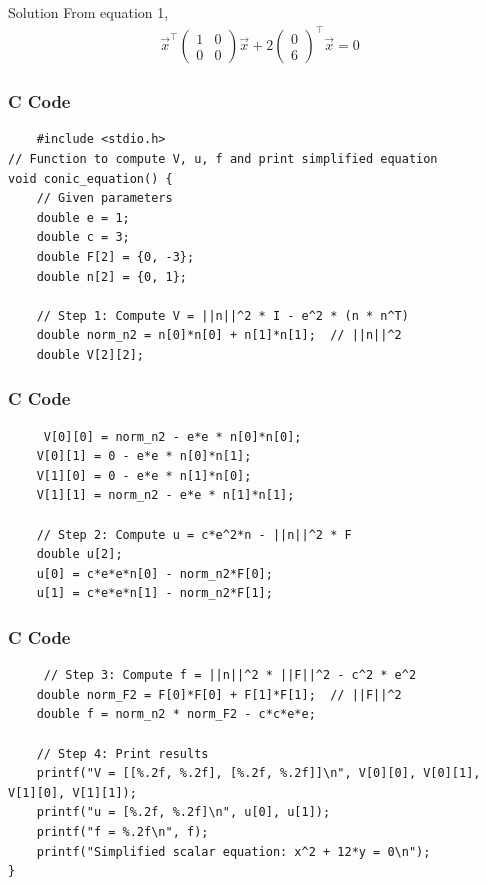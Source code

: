 \documentclass{beamer}
\begin{document}
\begin{frame}{Solution}
    From equation 1,
\begin{align}
    \Vec{x}^\top \begin{pmatrix}
        1 & 0 \\ 0 & 0
    \end{pmatrix} \Vec{x} + 2 \begin{pmatrix}
        0 \\ 6
    \end{pmatrix} ^ \top \Vec{x} =0 
\end{align}
\end{frame}
\begin{frame}[fragile]
\frametitle{C Code}
\begin{lstlisting}
    #include <stdio.h>
// Function to compute V, u, f and print simplified equation
void conic_equation() {
    // Given parameters
    double e = 1;
    double c = 3;
    double F[2] = {0, -3};
    double n[2] = {0, 1};

    // Step 1: Compute V = ||n||^2 * I - e^2 * (n * n^T)
    double norm_n2 = n[0]*n[0] + n[1]*n[1];  // ||n||^2
    double V[2][2];

\end{lstlisting}   
\end{frame}
\begin{frame}[fragile]
\frametitle{C Code}
\begin{lstlisting}
     V[0][0] = norm_n2 - e*e * n[0]*n[0];
    V[0][1] = 0 - e*e * n[0]*n[1];
    V[1][0] = 0 - e*e * n[1]*n[0];
    V[1][1] = norm_n2 - e*e * n[1]*n[1];

    // Step 2: Compute u = c*e^2*n - ||n||^2 * F
    double u[2];
    u[0] = c*e*e*n[0] - norm_n2*F[0];
    u[1] = c*e*e*n[1] - norm_n2*F[1];
\end{lstlisting}   
\end{frame}
\begin{frame}[fragile]
\frametitle{C Code}
\begin{lstlisting}
     // Step 3: Compute f = ||n||^2 * ||F||^2 - c^2 * e^2
    double norm_F2 = F[0]*F[0] + F[1]*F[1];  // ||F||^2
    double f = norm_n2 * norm_F2 - c*c*e*e;

    // Step 4: Print results
    printf("V = [[%.2f, %.2f], [%.2f, %.2f]]\n", V[0][0], V[0][1], V[1][0], V[1][1]);
    printf("u = [%.2f, %.2f]\n", u[0], u[1]);
    printf("f = %.2f\n", f);
    printf("Simplified scalar equation: x^2 + 12*y = 0\n");
}

\end{lstlisting}   
\end{frame}
\end{document}
